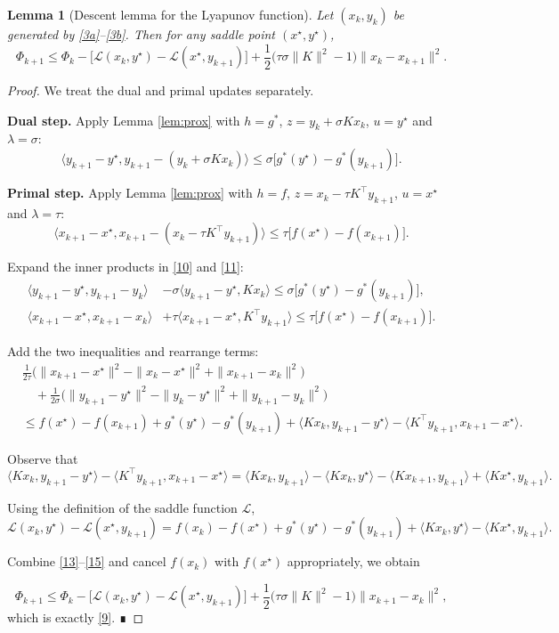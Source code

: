\documentclass{article}
\newtheorem{lemma}{Lemma}
\newcommand{\inner}[2]{\langle #1,#2\rangle}
\newcommand{\norm}[1]{\|#1\|}
\begin{document}
\begin{lemma}[Descent lemma for the Lyapunov function]\label{lem:lyap}
Let $(x_{k},y_{k})$ be generated by \eqref{3a}–\eqref{3b}. Then for any saddle point $(x^{\star},y^{\star})$,
\[
\Phi_{k+1}\le \Phi_{k}
-\bigl[\mathcal{L}(x_{k},y^{\star})-\mathcal{L}(x^{\star},y_{k+1})\bigr]
+\frac{1}{2}\bigl(\tau\sigma\|K\|^{2}-1\bigr)
\bigl\|x_{k}-x_{k+1}\bigr\|^{2}.
\tag{9}
\]
\end{lemma}
\begin{proof}
We treat the dual and primal updates separately.

\textbf{Dual step.}  
Apply Lemma \ref{lem:prox} with $h=g^{*}$, $z=y_{k}+\sigma Kx_{k}$, $u=y^{\star}$ and $\lambda=\sigma$:
\[
\inner{y_{k+1}-y^{\star}}{y_{k+1}-(y_{k}+\sigma Kx_{k})}
\le\sigma\bigl[g^{*}(y^{\star})-g^{*}(y_{k+1})\bigr].
\tag{10}
\]

\textbf{Primal step.}  
Apply Lemma \ref{lem:prox} with $h=f$, $z=x_{k}-\tau K^{\top}y_{k+1}$, $u=x^{\star}$ and $\lambda=\tau$:
\[
\inner{x_{k+1}-x^{\star}}{x_{k+1}-(x_{k}-\tau K^{\top}y_{k+1})}
\le\tau\bigl[f(x^{\star})-f(x_{k+1})\bigr].
\tag{11}
\]

Expand the inner products in \eqref{10} and \eqref{11}:
\[
\begin{aligned}
\inner{y_{k+1}-y^{\star}}{y_{k+1}-y_{k}}
&-\sigma\inner{y_{k+1}-y^{\star}}{Kx_{k}}
\le\sigma\bigl[g^{*}(y^{\star})-g^{*}(y_{k+1})\bigr],\\[1mm]
\inner{x_{k+1}-x^{\star}}{x_{k+1}-x_{k}}
&+\tau\inner{x_{k+1}-x^{\star}}{K^{\top}y_{k+1}}
\le\tau\bigl[f(x^{\star})-f(x_{k+1})\bigr].
\end{aligned}
\tag{12}
\]

Add the two inequalities and rearrange terms:
\[
\begin{aligned}
&\frac{1}{2\tau}\bigl(\norm{x_{k+1}-x^{\star}}^{2}
-\norm{x_{k}-x^{\star}}^{2}
+\norm{x_{k+1}-x_{k}}^{2}\bigr)\\
&\quad+\frac{1}{2\sigma}\bigl(\norm{y_{k+1}-y^{\star}}^{2}
-\norm{y_{k}-y^{\star}}^{2}
+\norm{y_{k+1}-y_{k}}^{2}\bigr)\\
&\le
f(x^{\star})-f(x_{k+1})+g^{*}(y^{\star})-g^{*}(y_{k+1})
+\inner{Kx_{k}}{y_{k+1}-y^{\star}}
-\inner{K^{\top}y_{k+1}}{x_{k+1}-x^{\star}}.
\end{aligned}
\tag{13}
\]

Observe that
\[
\inner{Kx_{k}}{y_{k+1}-y^{\star}}-\inner{K^{\top}y_{k+1}}{x_{k+1}-x^{\star}}
=
\inner{Kx_{k}}{y_{k+1}}-\inner{Kx_{k}}{y^{\star}}
-\inner{Kx_{k+1}}{y_{k+1}}+\inner{Kx^{\star}}{y_{k+1}}.
\tag{14}
\]

Using the definition of the saddle function $\mathcal{L}$,
\[
\mathcal{L}(x_{k},y^{\star})-\mathcal{L}(x^{\star},y_{k+1})
=
f(x_{k})-f(x^{\star})+g^{*}(y^{\star})-g^{*}(y_{k+1})
+\inner{Kx_{k}}{y^{\star}}-\inner{Kx^{\star}}{y_{k+1}}.
\tag{15}
\]

Combine \eqref{13}–\eqref{15} and cancel $f(x_{k})$ with $f(x^{\star})$ appropriately, we obtain

\[
\Phi_{k+1}\le \Phi_{k}
-\bigl[\mathcal{L}(x_{k},y^{\star})-\mathcal{L}(x^{\star},y_{k+1})\bigr]
+\frac{1}{2}\bigl(\tau\sigma\|K\|^{2}-1\bigr)\norm{x_{k+1}-x_{k}}^{2},
\]
which is exactly \eqref{9}. ∎
\end{proof}
\end{document}
